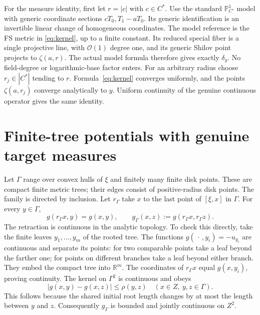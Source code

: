 \documentclass[11pt]{article}
\begin{document}
For the measure identity, first let $r=|c|$ with $c\in C^*$.
Use the standard $\mathbb P^1_{C^\circ}$ model with generic
coordinate sections $cT_0,T_1-aT_0$. Its generic identification is
an invertible linear change of homogeneous coordinates. The
model reference is the FS metric in \eqref{eq:kernel}, up to a
finite constant. Its reduced special fiber is a single projective
line, with $\mathcal O(1)$ degree one, and its generic Shilov point
projects to $\zeta(a,r)$. The actual model formula
\cite[Example 8.11 and (8.3)]{BE} therefore gives exactly
$\delta_y$. No field-degree or logarithmic-base factor enters.
For an arbitrary radius choose $r_j\in|C^*|$ tending to $r$.
Formula~\eqref{eq:kernel} converges uniformly, and the points
$\zeta(a,r_j)$ converge analytically to $y$. Uniform continuity
of the genuine continuous operator gives the same identity.

\section{Finite-tree potentials with genuine target measures}

Let $\Gamma$ range over convex hulls of $\xi$ and finitely many
finite disk points. These are compact finite metric trees; their
edges consist of positive-radius disk points. The family is
directed by inclusion. Let $r_\Gamma$ take $x$ to the last point
of $[\xi,x]$ in $\Gamma$. For every $y\in\Gamma$,
\begin{equation}\label{eq:retraction}
 g(r_\Gamma x,y)=g(x,y),\qquad
 g_\Gamma(x,z):=g(r_\Gamma x,r_\Gamma z).
\end{equation}
The retraction is continuous in the analytic topology. To check
this directly, take the finite leaves $y_1,\ldots,y_m$ of the
rooted tree. The functions $g(\,\cdot\,,y_i)=-u_{y_i}$ are
continuous and separate its points: for two comparable points
take a leaf beyond the farther one; for points on different
branches take a leaf beyond either branch. They embed the compact
tree into $\mathbb R^m$. The coordinates of $r_\Gamma x$ equal
$g(x,y_i)$, proving continuity. The kernel on $\Gamma^2$ is
continuous and obeys
\[
 |g(x,y)-g(x,z)|\leq\rho(y,z)\quad(x\in Z,\ y,z\in\Gamma).
\]
This follows because the shared initial root length changes by
at most the length between $y$ and $z$. Consequently $g_\Gamma$
is bounded and jointly continuous on $Z^2$.
\end{document}
